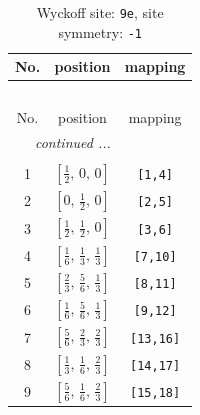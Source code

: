\documentclass[fleqn,8pt]{jsarticle}
\begin{document}
\begin{longtable}{ccc}
\caption{Wyckoff site: {\tt 9e}, site symmetry: {\tt -1}}
 \\
 \hline \hline
No. & position & mapping \\ \hline \endfirsthead

\multicolumn{2}{l}{\tablename\ \thetable{}} \\
 \hline \hline
No. & position & mapping \\ \hline \endhead

 \hline \hline
\multicolumn{2}{r}{\footnotesize\it continued ...} \\ \endfoot

 \hline \hline
\multicolumn{2}{r}{} \\ \endlastfoot

1 & $\left[ \frac{1}{2},\, 0,\, 0 \right]$ & {\tt [1,4]} \\ \hline
2 & $\left[ 0,\, \frac{1}{2},\, 0 \right]$ & {\tt [2,5]} \\ \hline
3 & $\left[ \frac{1}{2},\, \frac{1}{2},\, 0 \right]$ & {\tt [3,6]} \\ \hline
4 & $\left[ \frac{1}{6},\, \frac{1}{3},\, \frac{1}{3} \right]$ & {\tt [7,10]} \\ \hline
5 & $\left[ \frac{2}{3},\, \frac{5}{6},\, \frac{1}{3} \right]$ & {\tt [8,11]} \\ \hline
6 & $\left[ \frac{1}{6},\, \frac{5}{6},\, \frac{1}{3} \right]$ & {\tt [9,12]} \\ \hline
7 & $\left[ \frac{5}{6},\, \frac{2}{3},\, \frac{2}{3} \right]$ & {\tt [13,16]} \\ \hline
8 & $\left[ \frac{1}{3},\, \frac{1}{6},\, \frac{2}{3} \right]$ & {\tt [14,17]} \\ \hline
9 & $\left[ \frac{5}{6},\, \frac{1}{6},\, \frac{2}{3} \right]$ & {\tt [15,18]} \\
\end{longtable}
\renewcommand{\arraystretch}{1.2}
\end{document}
